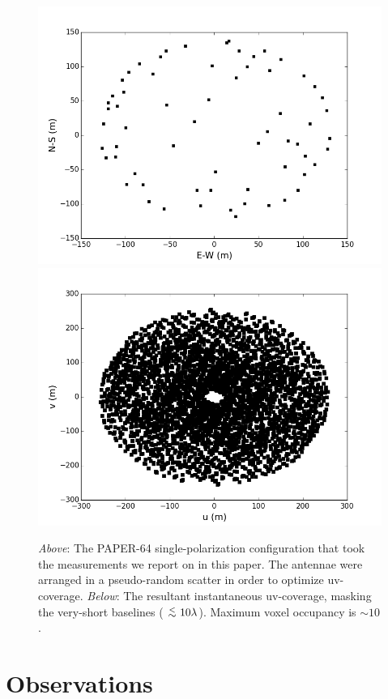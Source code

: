 \documentclass[useAMS,usenatbib]{mn2e}
\newcommand {\aplt} {\ {\raise-.5ex\hbox{$\buildrel<\over\sim$}}\ }
\begin{document}
\begin{figure}
\includegraphics[width=\columnwidth]{psa64imageconfig.png}
\includegraphics[width=\columnwidth]{psa64uvcoverage.png}
\caption{\textit{Above}: The PAPER-64 single-polarization configuration that took the measurements we report on in this paper. The antennae were arranged in a pseudo-random scatter in order to optimize uv-coverage. \textit{Below}: The resultant instantaneous uv-coverage, masking the very-short baselines ($\aplt 10 \lambda$). Maximum voxel occupancy is $\sim10$.}
\label{fig:config}
\end{figure}

\section{Observations}
\label{sec:obs}
\end{document}
